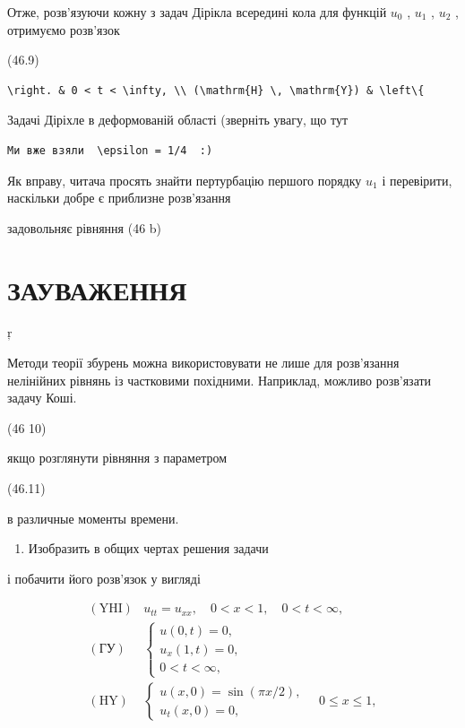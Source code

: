 \documentclass[
  ukrainian,
]{article}
\providecommand{\tightlist}{%
  \setlength{\itemsep}{0pt}\setlength{\parskip}{0pt}}
\begin{document}
Отже, розв'язуючи кожну з задач Дірікла всередині кола для функцій
\(u_0\) , \(u_1\) , \(u_2\) , отримуємо розв'язок

(46.9)

\begin{verbatim}
\right. & 0 < t < \infty, \\ (\mathrm{H} \, \mathrm{Y}) & \left\{
\end{verbatim}

Задачі Діріхле в деформованій області (зверніть увагу, що тут

\begin{verbatim}
Ми вже взяли  \epsilon = 1/4  :)
\end{verbatim}

Як вправу, читача просять знайти пертурбацію першого порядку \(u_1\) і
перевірити, наскільки добре є приблизне розв'язання

задовольняє рівняння (46 b)

\section{ЗАУВАЖЕННЯ}\label{ux437ux430ux443ux432ux430ux436ux435ux43dux43dux44f-7}

ŗ

Методи теорії збурень можна використовувати не лише для розв'язання
нелінійних рівнянь із частковими похідними. Наприклад, можливо
розв'язати задачу Коші.

(46 10)

якщо розглянути рівняння з параметром

(46.11)

в различные моменты времени.

\begin{enumerate}
\def\labelenumi{\arabic{enumi}.}
\setcounter{enumi}{1}
\tightlist
\item
  Изобразить в общих чертах решения задачи
\end{enumerate}

і побачити його розв'язок у вигляді

\[
\begin{array}{ll} (\text{YHI}) & u_{tt} = u_{xx}, \quad 0 < x < 1, \quad 0 < t < \infty, \\ (\text{ГУ}) & \begin{cases} u(0, t) = 0, \\ u_x(1, t) = 0, \\ 0 < t < \infty, \end{cases} \\ (\text{HY}) & \begin{cases} u(x, 0) = \sin(\pi x/2), \\ u_t(x, 0) = 0, \end{cases} \quad 0 \le x \le 1, \end{array}
\]
\end{document}

